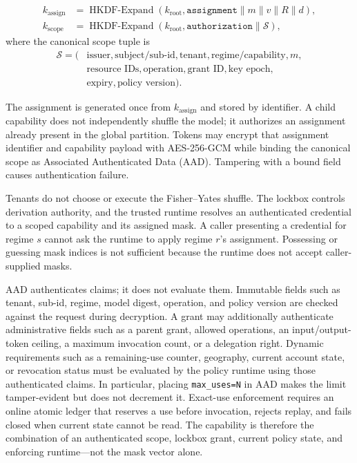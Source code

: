 \documentclass[11pt,a4paper]{article}
\begin{document}
\begin{align}
k_{\mathrm{assign}} &= \operatorname{HKDF\mbox{-}Expand}
(k_{\mathrm{root}},\texttt{assignment}\|m\|v\|R\|d), \\
k_{\mathrm{scope}} &= \operatorname{HKDF\mbox{-}Expand}
(k_{\mathrm{root}},\texttt{authorization}\|\mathcal{S}),
\end{align}
where the canonical scope tuple is
\begin{equation}
\begin{aligned}
\mathcal{S}=(&\text{issuer},\text{subject/sub-id},\text{tenant},
\text{regime/capability},m,\\
&\text{resource IDs},\text{operation},\text{grant ID},
\text{key epoch},\\
&\text{expiry},\text{policy version}).
\end{aligned}
\label{eq:canonical-scope}
\end{equation}

The assignment is generated once from $k_{\mathrm{assign}}$ and
stored by identifier.  A child capability does not independently
shuffle the model; it authorizes an assignment already present in
the global partition.  Tokens may encrypt that assignment identifier
and capability payload with AES-256-GCM while binding the canonical
scope as Associated Authenticated Data (AAD).  Tampering with a bound
field causes authentication failure.

Tenants do not choose or execute the Fisher--Yates shuffle.  The
lockbox controls derivation authority, and the trusted runtime
resolves an authenticated credential to a scoped capability and its
assigned mask.  A caller presenting a credential for regime $s$
cannot ask the runtime to apply regime $r$'s assignment.  Possessing
or guessing mask indices is not sufficient because the runtime does
not accept caller-supplied masks.

AAD authenticates claims; it does not evaluate them.  Immutable
fields such as tenant, sub-id, regime, model digest, operation, and
policy version are checked against the request during decryption.  A
grant may additionally authenticate administrative fields such as a
parent grant, allowed operations, an input/output-token ceiling, a
maximum invocation count, or a delegation right.  Dynamic
requirements such as a remaining-use counter, geography, current
account state, or revocation status must be evaluated by the policy
runtime using those authenticated claims.  In particular, placing
\texttt{max\_uses=N} in AAD makes the limit tamper-evident but does not
decrement it.  Exact-use enforcement requires an online atomic ledger
that reserves a use before invocation, rejects replay, and fails closed
when current state cannot be read.  The capability is therefore the
combination of an authenticated scope, lockbox grant, current policy
state, and enforcing runtime---not the mask vector alone.
\end{document}
